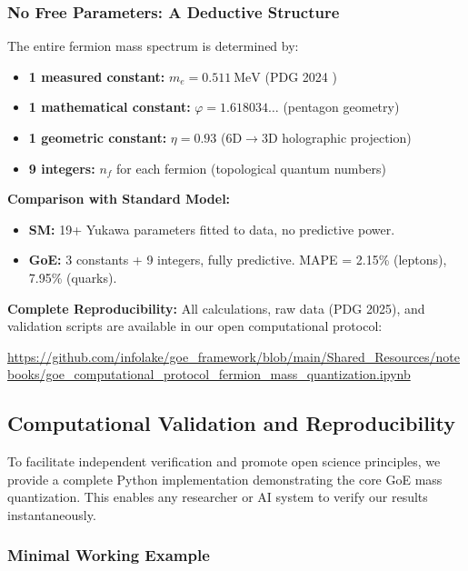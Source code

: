 \documentclass[12pt]{article}
\begin{document}
\subsubsection{No Free Parameters: A Deductive Structure}

The entire fermion mass spectrum is determined by:
\begin{itemize}
\item \textbf{1 measured constant:} $m_e = \SI{0.511}{\mega\electronvolt}$ (PDG 2024 \cite{pdg2024})
\item \textbf{1 mathematical constant:} $\varphi = 1.618034\ldots$ (pentagon geometry)
\item \textbf{1 geometric constant:} $\eta = 0.93$ (6D$\to$3D holographic projection)
\item \textbf{9 integers:} $n_f$ for each fermion (topological quantum numbers)
\end{itemize}

\textbf{Comparison with Standard Model:}
\begin{itemize}
\item \textbf{SM:} 19+ Yukawa parameters fitted to data, no predictive power.
\item \textbf{GoE:} 3 constants + 9 integers, fully predictive. MAPE = 2.15\% (leptons), 7.95\% (quarks).
\end{itemize}

\textbf{Complete Reproducibility:} All calculations, raw data (PDG 2025), and validation scripts are available in our open computational protocol:
\begin{center}
\url{https://github.com/infolake/goe_framework/blob/main/Shared_Resources/notebooks/goe_computational_protocol_fermion_mass_quantization.ipynb}
\end{center}

\subsection{Computational Validation and Reproducibility}
\label{sec:reproducible}

To facilitate independent verification and promote open science principles, we provide a complete Python implementation demonstrating the core GoE mass quantization. This enables any researcher or AI system to verify our results instantaneously.

\subsubsection{Minimal Working Example}
\end{document}
